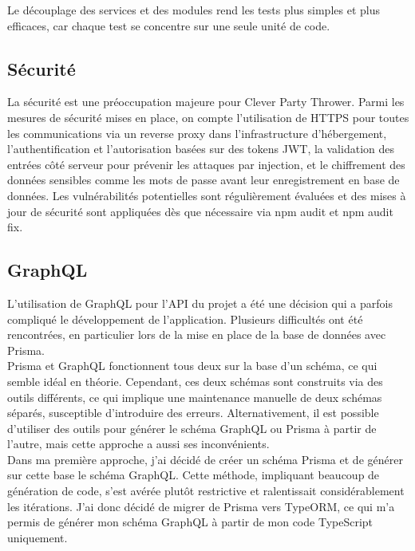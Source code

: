 Le découplage des services et des modules rend les tests plus simples et plus efficaces, car chaque test se concentre sur une seule unité de code.

\subsection{Sécurité}\label{subsec:securite}
La sécurité est une préoccupation majeure pour Clever Party Thrower.
Parmi les mesures de sécurité mises en place, on compte l'utilisation de HTTPS pour toutes les communications via un reverse proxy dans l'infrastructure d'hébergement,
l'authentification et l'autorisation basées sur des tokens JWT, la validation des entrées côté serveur pour prévenir les attaques par injection,
et le chiffrement des données sensibles comme les mots de passe avant leur enregistrement en base de données.
Les vulnérabilités potentielles sont régulièrement évaluées et des mises à jour de sécurité sont appliquées dès que nécessaire via npm audit et npm audit fix.

\subsection{GraphQL}\label{subsec:graphql}
L'utilisation de GraphQL pour l'API du projet a été une décision qui a parfois compliqué le développement de l'application.
Plusieurs difficultés ont été rencontrées, en particulier lors de la mise en place de la base de données avec Prisma.\\

Prisma et GraphQL fonctionnent tous deux sur la base d'un schéma, ce qui semble idéal en théorie.
Cependant, ces deux schémas sont construits via des outils différents, ce qui implique une maintenance manuelle de deux schémas séparés, susceptible d'introduire des erreurs.
Alternativement, il est possible d'utiliser des outils pour générer le schéma GraphQL ou Prisma à partir de l'autre, mais cette approche a aussi ses inconvénients.\\

Dans ma première approche, j'ai décidé de créer un schéma Prisma et de générer sur cette base le schéma GraphQL. Cette méthode, impliquant beaucoup de génération de code, s'est avérée plutôt restrictive et ralentissait considérablement les itérations.
J'ai donc décidé de migrer de Prisma vers TypeORM, ce qui m'a permis de générer mon schéma GraphQL à partir de mon code TypeScript uniquement.\\

